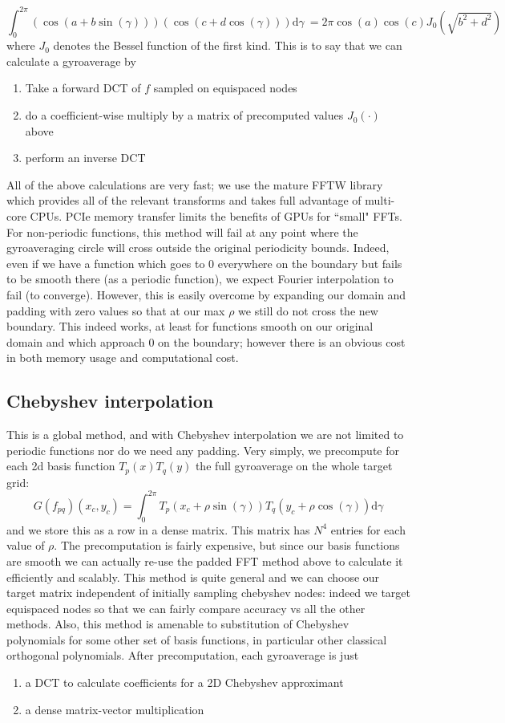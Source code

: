 \documentclass{article}
\theoremstyle{theorem}
\theoremstyle{definition}
\begin{document}
\[ \int_{0}^{2 \pi} \left( \cos(a + b \sin(\gamma)) \right) \left( \cos(c + d \cos(\gamma)) \right) \mathrm{d} \gamma\  = 2\pi \cos(a) \cos(c) J_0(\sqrt{b^2+d^2})  \]
where $J_0$ denotes the Bessel function of the first kind. This is to say that we can calculate a gyroaverage by
\begin{enumerate}
	\item Take a forward DCT of $f$ sampled on equispaced nodes
	\item do a coefficient-wise multiply by a matrix of precomputed values $J_0(\cdot)$ above
	\item perform an inverse DCT
\end{enumerate}
All of the above calculations are very fast; we use the mature FFTW library which provides all of the relevant transforms and takes full advantage of multi-core CPUs.  PCIe memory transfer limits the benefits of GPUs for ``small" FFTs. \\

For non-periodic functions, this method will fail at any point where the gyroaveraging circle will cross outside the original periodicity bounds.  Indeed, even if we have a function which goes to 0 everywhere on the boundary but fails to be smooth there (as a periodic function), we expect Fourier interpolation to fail (to converge).  However, this is easily overcome by expanding our domain and padding with zero values so that at our max $\rho$ we still do not cross the new boundary.  This indeed works, at least for functions smooth on our original domain and which approach 0 on the boundary; however there is an obvious cost in both memory usage and computational cost. 

\subsection{Chebyshev interpolation}
This is a global method, and with Chebyshev interpolation we are not limited to periodic functions nor do we need any padding.  Very simply, we precompute for each 2d basis function $T_p(x) T_q(y)$ the full gyroaverage on the whole target grid:
\[  G(f_{pq})(x_c,y_c) = \int_{0}^{2\pi} T_p(x_c + \rho \sin(\gamma))T_q(y_c + \rho \cos(\gamma)) \mathrm{d} \gamma \]
and we store this as a row in a dense matrix.  This matrix has $N^4$ entries for each value of $\rho$.  The precomputation is fairly expensive, but since our basis functions are smooth we can actually re-use the padded FFT method above to calculate it efficiently and scalably.  This method is quite general and we can choose our target matrix independent of initially sampling chebyshev nodes: indeed we target equispaced nodes so that we can fairly compare accuracy vs all the other methods.  Also, this method is amenable to substitution of Chebyshev polynomials for some other set of basis functions, in particular other classical orthogonal polynomials.      
After precomputation, each gyroaverage is just 
\begin{enumerate}
	\item a DCT to calculate coefficients for a 2D Chebyshev approximant
	\item a dense matrix-vector multiplication
\end{enumerate}
 
\end{document}
